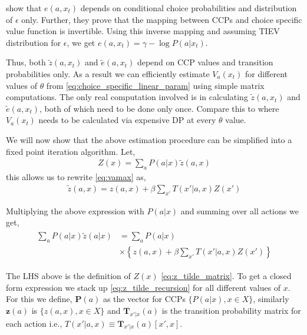 \documentclass{article}
\begin{document}
\cite{hotz} show that $e(a, x_t)$ depends on conditional choice probabilities and distribution of $\epsilon$ only. Further, they prove that the mapping between CCPs and choice specific value function is invertible. Using this inverse mapping and assuming TIEV distribution for $\epsilon$, we get $e(a, x_t) = \gamma - \log P(a|x_t)$.

Thus, both $\tilde{z}(a, x_t)$ and $\tilde{e}(a, x_t)$ depend on CCP values and transition probabilities only. As a result we can efficiently estimate $V_a(x_t)$ for different values of $\theta$ from \eqref{eq:choice_specific_linear_param} using simple matrix computations. The only real computation involved is in calculating $\tilde{z}(a, x_t)$ and $\tilde{e}(a, x_t)$, both of which need to be done only once. Compare this to \cite{ziebart} where $V_a(x_t)$ needs to be calculated via expensive DP at every $\theta$ value. 

We will now show that the above estimation procedure can be simplified into a fixed point iteration algorithm. Let,
\begin{align}\label{eq:z_tilde_matrix}
Z(x) = \sum_{a}P(a|x)\tilde{z}(a, x)
\end{align}
this allows us to rewrite \eqref{eq:vamax} as,
\begin{align}\label{eq:z_tilde_from_Z}
\tilde{z}(a, x) = z(a, x) + \beta\sum_{x'}T(x'|a, x)Z(x')
\end{align}

Multiplying the above expression with $P(a|x)$ and summing over all actions we get,
\begin{align}\label{eq:z_tilde_recursion}
\begin{split}
\sum_{a}P(a|x)\tilde{z}(a|x) &= \sum_{a}P(a|x) \\
& \times \left\{z(a, x) + \beta\sum_{x'}T(x'|a,x)Z(x') \right\}
\end{split}
\end{align}

The LHS above is the definition of $Z(x)$ \eqref{eq:z_tilde_matrix}. To get a closed form expression we stack up \eqref{eq:z_tilde_recursion} for all different values of $x$. For this we define, 
$\mathbf{P}(a)$ as the vector for CCPs $\{P(a|x), x \in X\}$, similarly $\mathbf{z}(a)$ is $\{z(a, x), x \in X\}$ and $\mathbf{T}_{x'|x}(a)$ is the transition probability matrix for each 
action i.e., $T(x'|a, x) \equiv \mathbf{T}_{x'|x}(a)[x', x]$.
\end{document}
